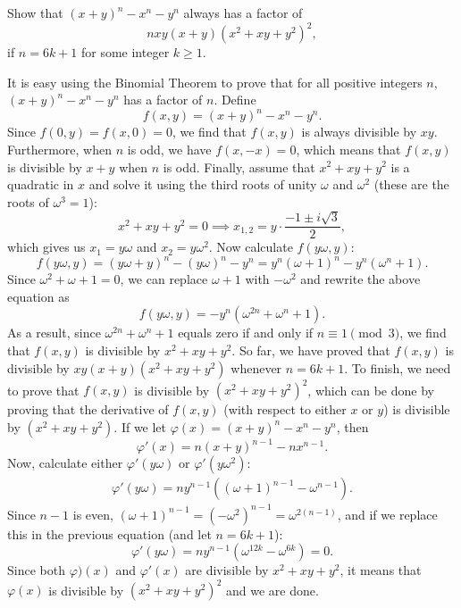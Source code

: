 \documentclass[12pt,a4paper]{memoir}
\theoremstyle{definition}
\begin{document}
	
	
	
	
	\setcounter{question}{62}
	
	
	
	\begin{tcolorbox}
		\begin{question}
			Show that $(x+y)^n - x^n - y^n$ always has a factor of \[nxy(x+y)(x^2+xy+y^2)^2,\] if $n=6k+1$ for some integer $k\geq 1$.
		\end{question}
	\end{tcolorbox}
	
	\begin{solution}
		It is easy using the Binomial Theorem to prove that for all positive integers $n$, $(x+y)^n - x^n - y^n$ has a factor of $n$. Define
		\[f(x,y)=(x+y)^n - x^n - y^n.\]
		Since $f(0,y)=f(x,0)=0$, we find that $f(x,y)$ is always divisible by $xy$. Furthermore, when $n$ is odd, we have $f(x,-x)=0$, which means that $f(x,y)$ is divisible by $x+y$ when $n$ is odd. Finally, assume that $x^2+xy+y^2$ is a quadratic in $x$ and solve it using the third roots of unity $\omega$ and $\omega^2$ (these are the roots of $\omega^3=1$):
		\[x^2+xy+y^2=0 \implies x_{1,2} = y \cdot \frac{-1 \pm i\sqrt{3}}{2},\]
		which gives us $x_1=y\omega$ and $x_2=y\omega^2$. Now calculate $f(y\omega,y)$:
		\[f(y\omega,y)=(y\omega+y)^n - (y\omega)^n - y^n = y^n(\omega+1)^n - y^n(\omega^n +1).\]
		Since $\omega^2+\omega+1=0$, we can replace $\omega+1$ with $-\omega^2$ and rewrite the above equation as
		\[f(y\omega,y)=-y^n(\omega^{2n}+\omega^n+1).\]
		As a result, since $\omega^{2n}+\omega^n+1$ equals zero if and only if $n\equiv 1 \pmod 3$, we find that $f(x,y)$ is divisible by $x^2+xy+y^2$. So far, we have proved that $f(x,y)$ is divisible by $xy(x+y)(x^2+xy+y^2)$ whenever $n=6k+1$. To finish, we need to prove that $f(x,y)$ is divisible by $(x^2+xy+y^2)^2$, which can be done by proving that the derivative of $f(x,y)$ (with respect to either $x$ or $y$) is divisible by $(x^2+xy+y^2)$. If we let
		$\varphi(x)=(x+y)^n - x^n - y^n$, then
		\[\varphi'(x)=n(x+y)^{n-1}-nx^{n-1}.\]
		Now, calculate either $\varphi'(y\omega)$ or $\varphi'(y\omega^2)$:
		\begin{align*}
			\varphi'(y\omega)= ny^{n-1}\left((\omega+1)^{n-1}-\omega^{n-1}\right).
		\end{align*}
		Since $n-1$ is even, $(\omega+1)^{n-1} = (-\omega^2)^{n-1} = \omega^{2(n-1)}$, and if we replace this in the previous equation (and let $n=6k+1$):
		\[\varphi'(y\omega) = ny^{n-1} \left(\omega^{12k} - \omega^{6k}\right)=0.\]
		Since both $\varphi)(x)$ and $\varphi'(x)$ are divisible by $x^2+xy+y^2$, it means that $\varphi(x)$ is divisible by $(x^2+xy+y^2)^2$ and we are done.
	\end{solution}
	
\end{document}
